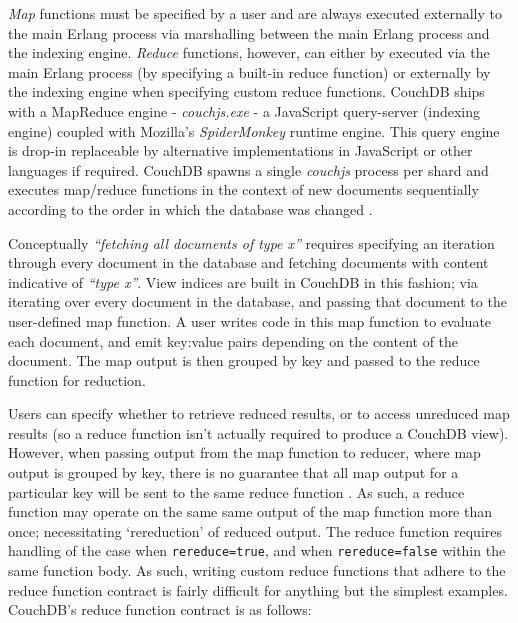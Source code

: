 \textit{Map} functions must be specified by a user and are always executed externally to the main Erlang process via marshalling between the main Erlang process and the indexing engine. \textit{Reduce} functions, however, can either by executed via the main Erlang process (by specifying a built-in reduce function) or externally by the indexing engine when specifying custom reduce functions. CouchDB ships with a MapReduce engine - \textit{couchjs.exe} - a JavaScript query-server (indexing engine) coupled with Mozilla's \textit{SpiderMonkey} runtime engine. This query engine is drop-in replaceable by alternative implementations in JavaScript or other languages if required. CouchDB spawns a single \textit{couchjs} process per shard and executes map/reduce functions in the context of new documents sequentially according to the order in which the database was changed \cite{slack2Nov,slack7Nov}.

Conceptually \textit{``fetching all documents of type x''} requires specifying an iteration through every document in the database and fetching documents with content indicative of \textit{``type x''}. View indices are built in CouchDB in this fashion; via iterating over every document in the database, and passing that document to the user-defined map function. A user writes code in this map function to evaluate each document, and emit key:value pairs depending on the content of the document. The map output is then grouped by key and passed to the reduce function for reduction.

Users can specify whether to retrieve reduced results, or to access unreduced map results (so a reduce function isn't actually required to produce a CouchDB view). However, when passing output from the map function to reducer, where map output is grouped by key, there is no guarantee that all map output for a particular key will be sent to the same reduce function \cite{reduceFunctions}. As such, a reduce function may operate on the same same output of the map function more than once; necessitating `rereduction' of reduced output. The reduce function requires handling of the case when \texttt{rereduce=true}, and when \texttt{rereduce=false} within the same function body. As such, writing custom reduce functions that adhere to the reduce function contract is fairly difficult for anything but the simplest examples. CouchDB's reduce function contract is as follows:


